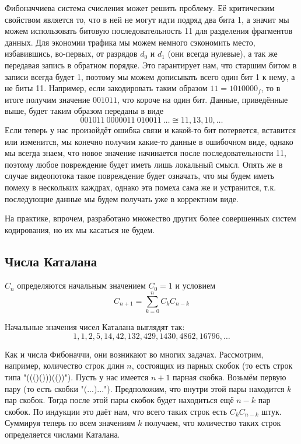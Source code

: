 Фибоначчиева система счисления может решить проблему. Её критическим свойством является то, что в ней не могут идти подряд два бита 1, а значит мы можем использовать битовую последовательность 11 для разделения фрагментов данных. Для экономии трафика мы можем немного сэкономить место, избавившись, во-первых, от разрядов $d_0$ и $d_1$ (они всегда нулевые), а так же передавая запись в обратном порядке. Это гарантирует нам, что старшим битом в записи всегда будет 1, поэтому мы можем дописывать всего один бит 1 к нему, а не биты 11. Например, если закодировать таким образом $11=1010000_f$, то в итоге получим значение $001011$, что короче на один бит. Данные, приведённые выше, будет таким образом переданы в виде
$$001011\ 0000011\ 010011\ \ldots \cong 11, 13, 10, \ldots$$
Если теперь у нас произойдёт ошибка связи и какой-то бит потеряется, вставится или изменится, мы конечно получим какие-то данные в ошибочном виде, однако мы всегда знаем, что новое значение начинается после последовательности 11, поэтому любое повреждение будет иметь лишь локальный смысл. Опять же в случае видеопотока такое повреждение будет означать, что мы будем иметь помеху в нескольких каждрах, однако эта помеха сама же и устранится, т.к. последующие данные мы будем получать уже в корректном виде.

На практике, впрочем, разработано множество других более совершенных систем кодирования, но их мы касаться не будем.

\subsection{Числа Каталана}

\begin{definition}
 $C_n$ определяются начальным значением $C_0 = 1$ и условием
$$C_{n+1} = \sum_{k=0}^n C_kC_{n-k}$$
\end{definition}

Начальные значения чисел Каталана выглядят так:
$$1, 1, 2, 5, 14, 42, 132, 429, 1430, 4862, 16796, \ldots$$

Как и числа Фибоначчи, они возникают во многих задачах. Рассмотрим, например, количество строк длин $n$, состоящих из парных скобок (то есть строк типа "((()()))(())"). Пусть у нас имеется $n+1$ парная скобка. Возьмём первую пару (то есть скобки "(...)..."). Предположим, что внутри этой пары находится $k$ пар скобок. Тогда после этой пары скобок будет находиться ещё $n-k$ пар скобок. По индукции это даёт нам, что всего таких строк есть $C_kC_{n-k}$ штук. Суммируя теперь по всем значениям $k$ получаем, что количество таких строк определяется числами Каталана.

